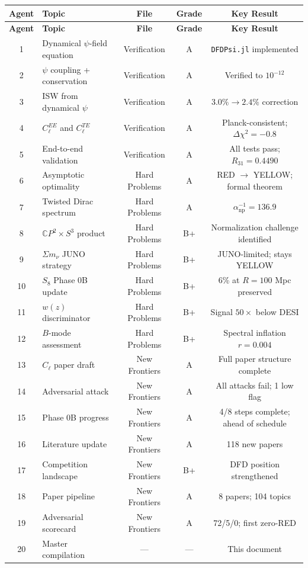 \documentclass[11pt,a4paper]{article}
\newcommand{\CP}{\mathbb{C}P}
\begin{document}
\begin{center}
\begin{longtable}{clccc}
\toprule
\textbf{Agent} & \textbf{Topic} & \textbf{File} & \textbf{Grade} & \textbf{Key Result} \\
\midrule
\endfirsthead
\toprule
\textbf{Agent} & \textbf{Topic} & \textbf{File} & \textbf{Grade} & \textbf{Key Result} \\
\midrule
\endhead
1 & Dynamical $\psi$-field equation & Verification & A & \texttt{DFDPsi.jl} implemented \\
2 & $\psi$ coupling + conservation & Verification & A & Verified to $10^{-12}$ \\
3 & ISW from dynamical $\psi$ & Verification & A & $3.0\% \to 2.4\%$ correction \\
4 & $C_\ell^{EE}$ and $C_\ell^{TE}$ & Verification & A & Planck-consistent; $\Delta\chi^2 = -0.8$ \\
5 & End-to-end validation & Verification & A & All tests pass; $R_{31} = 0.4490$ \\
\midrule
6 & Asymptotic optimality & Hard Problems & A & RED $\to$ YELLOW; formal theorem \\
7 & Twisted Dirac spectrum & Hard Problems & A & $\alpha^{-1}_{\mathrm{np}} = 136.9$ \\
8 & $\CP^2 \times S^3$ product & Hard Problems & B+ & Normalization challenge identified \\
9 & $\Sigma m_\nu$ JUNO strategy & Hard Problems & B+ & JUNO-limited; stays YELLOW \\
10 & $S_8$ Phase 0B update & Hard Problems & B+ & 6\% at $R = 100$ Mpc preserved \\
11 & $w(z)$ discriminator & Hard Problems & B+ & Signal $50\times$ below DESI \\
12 & $B$-mode assessment & Hard Problems & B+ & Spectral inflation $r = 0.004$ \\
\midrule
13 & $C_\ell$ paper draft & New Frontiers & A & Full paper structure complete \\
14 & Adversarial attack & New Frontiers & A & All attacks fail; 1 low flag \\
15 & Phase 0B progress & New Frontiers & A & 4/8 steps complete; ahead of schedule \\
16 & Literature update & New Frontiers & A & 118 new papers \\
17 & Competition landscape & New Frontiers & B+ & DFD position strengthened \\
18 & Paper pipeline & New Frontiers & A & 8 papers; 104 topics \\
19 & Adversarial scorecard & New Frontiers & A & 72/5/0; first zero-RED \\
20 & Master compilation & --- & --- & This document \\
\bottomrule
\end{longtable}
\end{center}
\end{document}
